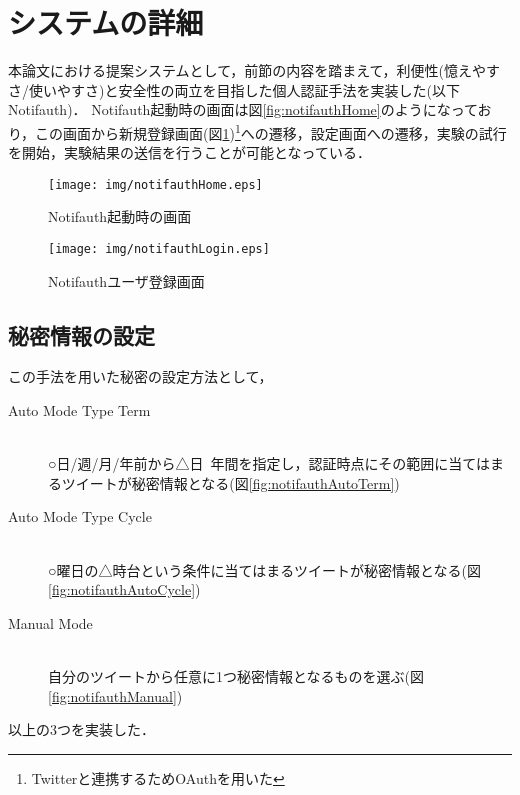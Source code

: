 \section{システムの詳細}
本論文における提案システムとして，前節の内容を踏まえて，利便性(憶えやすさ/使いやすさ)と安全性の両立を目指した個人認証手法を実装した(以下Notifauth)．
Notifauth起動時の画面は図\ref{fig:notifauthHome}のようになっており，この画面から新規登録画面(図\ref{fig:notifauthLogin})\footnote{Twitterと連携するためOAuthを用いた}への遷移，設定画面への遷移，実験の試行を開始，実験結果の送信を行うことが可能となっている．

\begin{figure}[ht]
  \begin{minipage}{0.5\hsize}
    \begin{center}
      \texttt{[image: img/notifauthHome.eps]}
    \end{center}
    \caption{Notifauth起動時の画面}
    \label{fig:notifauthHome}
  \end{minipage}
  \begin{minipage}{0.5\hsize}
    \begin{center}
      \texttt{[image: img/notifauthLogin.eps]}
    \end{center}
    \caption{Notifauthユーザ登録画面}
    \label{fig:notifauthLogin}
  \end{minipage}
\end{figure}

\subsection{秘密情報の設定}\label{subsec:selectSecret}
この手法を用いた秘密の設定方法として，
\begin{description}
  \item[Auto Mode Type Term]\mbox{}\\
    ○日/週/月/年前から△日~年間を指定し，認証時点にその範囲に当てはまるツイートが秘密情報となる(図\ref{fig:notifauthAutoTerm})
  \item[Auto Mode Type Cycle]\mbox{}\\
    ○曜日の△時台という条件に当てはまるツイートが秘密情報となる(図\ref{fig:notifauthAutoCycle})
  \item[Manual Mode]\mbox{}\\
    自分のツイートから任意に1つ秘密情報となるものを選ぶ(図\ref{fig:notifauthManual})
\end{description}
以上の3つを実装した．

